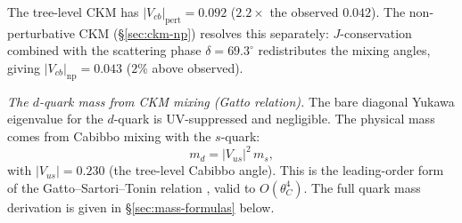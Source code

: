 The tree-level CKM has $|V_{cb}|_{\mathrm{pert}} = 0.092$
($2.2\times$ the observed $0.042$).
The non-perturbative CKM (\S\ref{sec:ckm-np}) resolves this
separately: $J$-conservation combined with the scattering phase
$\delta = 69.3^\circ$ redistributes the mixing angles,
giving $|V_{cb}|_{\mathrm{np}} = 0.043$ ($2\%$ above observed).

\emph{The $d$-quark mass from CKM mixing (Gatto relation).}
The bare diagonal Yukawa eigenvalue for the $d$-quark
is UV-suppressed and negligible.
The physical mass comes from Cabibbo mixing
with the $s$-quark:
\begin{equation}\label{eq:gatto}
  m_d = |V_{us}|^2\,m_s,
\end{equation}
with $|V_{us}| = 0.230$ (the tree-level Cabibbo angle).
This is the leading-order form of the Gatto--Sartori--Tonin
relation \citep{Gatto1968}, valid to $O(\theta_C^4)$.
The full quark mass derivation is given in
\S\ref{sec:mass-formulas} below.

